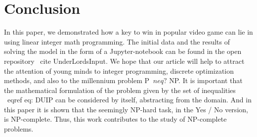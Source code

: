 \documentclass{article}
\begin{document}
\section{Conclusion}
\label{SectionConclusion}
In this paper, we demonstrated how a key to win in popular video game can lie in using linear integer math programming.
The initial data and the results of solving the model in the form of a Jupyter-notebook can be found in the open repository \ cite {UnderLordsInput}.
We hope that our article will help to attract the attention of young minds to integer programming, discrete optimization methods, and also to the millennium problem P $ \ neq? $ NP.
It is important that the mathematical formulation of the problem given by the set of inequalities \ eqref {eq: DUIP} can be considered by itself, abstracting from the domain. And in this paper it is shown that the seemingly NP-hard task, in the Yes / No version, is NP-complete.
Thus, this work contributes to the study of NP-complete problems.



\end{document}
